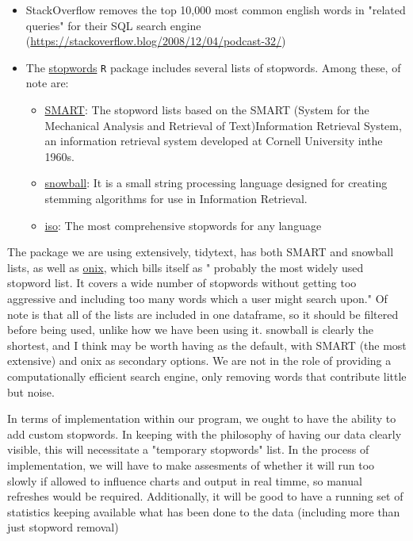 \documentclass[a4paper, 11pt]{article}
\begin{document}
\begin{itemize}
\item StackOverflow removes the top 10,000 most common english words in
"related queries" for their SQL search engine
(\url{https://stackoverflow.blog/2008/12/04/podcast-32/})
\item The \href{https://github.com/quanteda/stopwords}{stopwords} \texttt{R} package includes several lists of stopwords. Among
these, of note are:
\begin{itemize}
\item \href{http://www.ai.mit.edu/projects/jmlr/papers/volume5/lewis04a/a11-smart-stop-list/english.stop}{SMART}: The stopword lists based on the SMART (System for the
Mechanical Analysis and Retrieval of Text)Information Retrieval
System, an information retrieval system developed at Cornell
University inthe 1960s.
\item \href{http://snowball.tartarus.org/algorithms/english/stop.txt}{snowball}: It is a small string processing language designed for
creating stemming algorithms for use in Information Retrieval.
\item \href{https://github.com/stopwords-iso/stopwords-iso/blob/master/stopwords-iso.json}{iso}: The most comprehensive stopwords for any language
\end{itemize}
\end{itemize}

The package we are using extensively, tidytext, has both SMART and
snowball lists, as well as \href{http://www.lextek.com/manuals/onix/stopwords1.html}{onix}, which bills itself as " probably the
most widely used stopword list. It covers a wide number of stopwords
without getting too aggressive and including too many words which a
user might search upon." Of note is that all of the lists are included
in one dataframe, so it should be filtered before being used, unlike
how we have been using it. snowball is clearly the shortest, and I
think may be worth having as the default, with SMART (the most
extensive) and onix as secondary options. We are not in the role of
providing a computationally efficient search engine, only removing
words that contribute little but noise.

In terms of implementation within our program, we ought to have the
ability to add custom stopwords. In keeping with the philosophy of
having our data clearly visible, this will necessitate a "temporary
stopwords" list. In the process of implementation, we will have to
make assesments of whether it will run too slowly if allowed to
influence charts and output in real timme, so manual refreshes would
be required. Additionally, it will be good to have a running set of
statistics keeping available what has been done to the data (including
more than just stopword removal)
\end{document}
